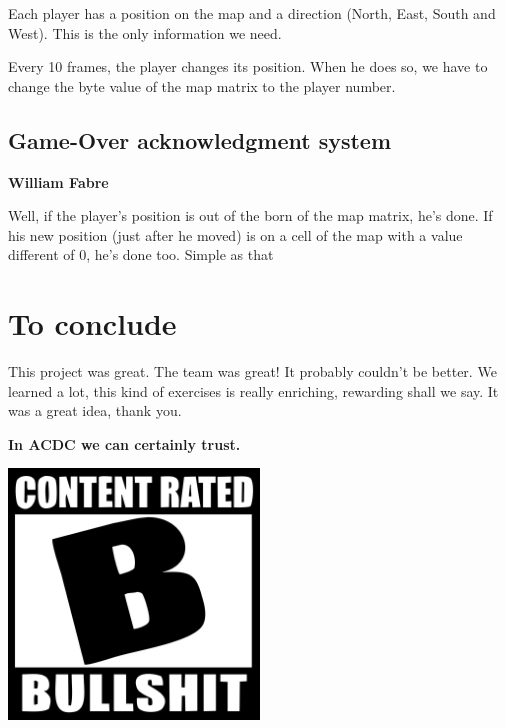 \documentclass[pdftex,12pt,a4paper]{report}
\begin{document}
Each player has a position on the map and a direction (North, East,
South and West). This is the only information we need.

Every 10 frames, the player changes its position. When he does so, we
have to change the byte value of the map matrix to the player number.

\subsection{Game-Over acknowledgment system}

\textbf{William Fabre}

Well, if the player's position is out of the born of the map matrix,
he's done. If his new position (just after he moved) is on a cell of the
map with a value different of 0, he's done too. Simple as that

\section{To conclude}

This project was great. The team was great! It probably couldn't be
better. We learned a lot, this kind of exercises is really enriching,
rewarding shall we say. It was a great idea, thank you.

\textbf{In ACDC we can certainly trust.}

\begin{center}
\includegraphics[width=0.5\textwidth]{bullshit.jpg}
\end{center}
\end{document}

